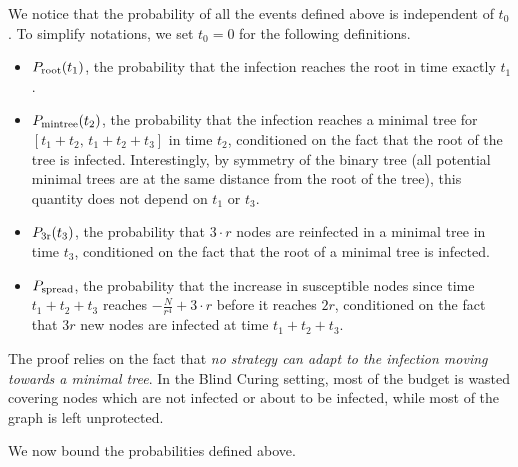 We notice that the probability of all the events defined above is independent of $t_0$. To simplify notations, we set $t_0=0$ for the following definitions. 
\begin{itemize}
\item $P_{\rm root}(t_1)$, the probability that the infection reaches the root in time exactly $t_1$.
\item $P_{\rm mintree}(t_2)$, the probability that the infection reaches a minimal tree for $[t_1 + t_2, \, t_1 + t_2 + t_3]$ in time $t_2$, conditioned on the fact that the root of the tree is infected. Interestingly, by symmetry of the binary tree (all potential minimal trees are at the same distance from the root of the tree), this quantity does not depend on $t_1$ or $t_3$.
\item $P_{\rm 3r}(t_3)$, the probability that $3\cdot r$ nodes are reinfected in a minimal tree in time $t_3$, conditioned on the fact that the root of a minimal tree is infected. 
\item $P_{\rm spread}$, the probability that the increase in susceptible nodes since time $t_1 + t_2 + t_3$ reaches $-\frac{N}{r^4} + 3\cdot r$ before it reaches $2r$, conditioned on the fact that $3r$ new nodes are infected at time $t_1 + t_2 + t_3$.
\end{itemize}

The proof relies on the fact that \textit{no strategy can adapt to the infection moving towards a minimal tree}. In the Blind Curing setting, most of the budget is wasted covering nodes which are not infected or about to be infected, while most of the graph is left unprotected.


We now bound the probabilities defined above.

